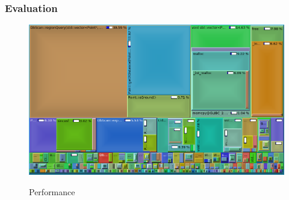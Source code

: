 \documentclass[nosymbols]{beamer}	%
\begin{document}
\begin{frame}
\frametitle{Evaluation}
\begin{figure}[!ht]
\begin{center}
\caption{Performance}
\includegraphics[width=\textwidth,height=0.7\textheight,keepaspectratio]{bilder/call.png}
\label{obst_cases}
\end{center}
\end{figure}
\end{frame}




\addtocounter{framenumber}{-1}
\begin{frame}[plain]
	
	\titlepage
\end{frame}
%
\end{document}
